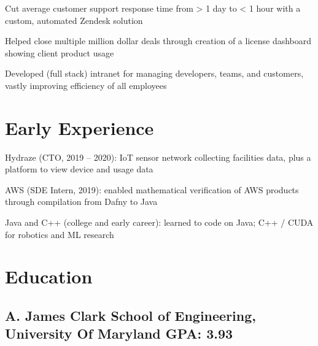 \documentclass[print]{jack-resume}
\begin{document}
\begin{tightemize}
    \item Cut average customer support response time from > 1 day to < 1 hour with a custom, automated Zendesk solution
    \item Helped close multiple million dollar deals through creation of a license dashboard showing client product usage
    \item Developed (full stack) intranet for managing developers, teams, and customers, vastly improving efficiency of all employees
\end{tightemize}
\sectionsep

\section{Early Experience}
\vspace{1.4em}
\begin{tightemize}
    \item Hydraze (CTO, 2019 -- 2020): IoT sensor network collecting facilities data, plus a platform to view device and usage data
    \item AWS (SDE Intern, 2019): enabled mathematical verification of AWS products through compilation from Dafny to Java
    \item Java and C++ (college and early career): learned to code on Java; C++ / CUDA for robotics and ML research
\end{tightemize}
\sectionsep

\section{Education}
\subsection{A. James Clark School of Engineering, University Of Maryland \hfill GPA: 3.93}

\begin{minipage}[t]{0.04\textwidth}
    \hfill
\end{minipage}
\end{document}
